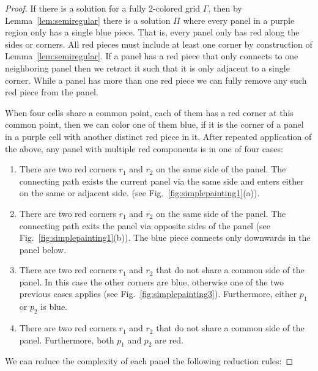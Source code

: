 \documentclass[runningheads]{llncs}
\begin{document}
\begin{proof}
	If there is a solution for a fully 2-colored grid $\Gamma$, then by Lemma~\ref{lem:semiregular} there is a solution $\Pi$ where every panel in a purple region only has a single blue piece.
That is, every panel only has red along the sides or corners.
All red pieces must include at least one corner by construction of Lemma~\ref{lem:semiregular}.
If a panel has a red piece that only connects to one neighboring panel then we retract it such that it is only adjacent to a single corner.
While a panel has more than one red piece we can fully remove any such red piece from the panel.

When four cells share a common point, each of them has a red corner at this common point, then we can color one of them blue, if it is the corner of a panel in a purple cell with another distinct red piece in it.
After repeated application of the above, any panel with multiple red components is in one of four cases:

	\begin{enumerate}
		\item There are two red corners $r_1$ and $r_2$ on the same side of the panel. The connecting path exists the current panel via the same side and enters either on the same or adjacent side. (see Fig.~\ref{fig:simplepainting1}(a)).
		\item There are two red corners $r_1$ and $r_2$ on the same side of the panel. The connecting path exits the panel via opposite sides of the panel (see Fig.~\ref{fig:simplepainting1}(b)). The blue piece connects only downwards in the panel below.
        \item There are two red corners $r_1$ and $r_2$ that do not share a common side of the panel. In this case the other corners are blue, otherwise one of the two previous cases applies (see Fig.~\ref{fig:simplepainting3}). Furthermore, either $p_1$ or $p_2$ is blue.
        \item There are two red corners $r_1$ and $r_2$ that do not share a common side of the panel. Furthermore, both $p_1$ and $p_2$ are red.
	\end{enumerate}
	
	We can reduce the complexity of each panel the following reduction rules:
	

\end{proof}
\end{document}
